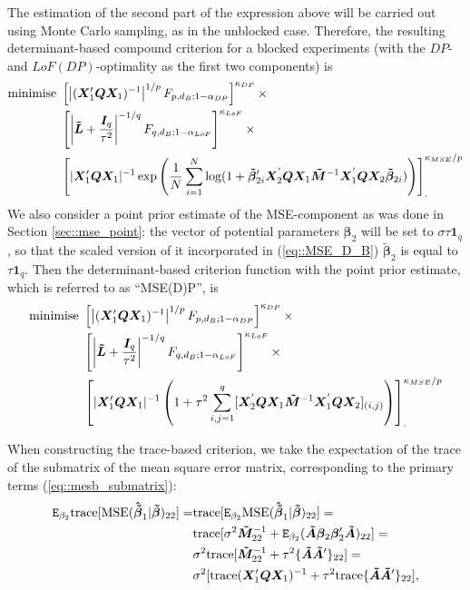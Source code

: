 The estimation of the second part of the expression above will be carried out using Monte Carlo sampling, as in the unblocked case. Therefore, the resulting determinant-based compound criterion for a blocked experiments (with the $DP$- and $LoF(DP)$-optimality as the first two components) is
\begin{align}
\label{eq::MSE_D_B}
\mbox{minimise }&\left[\left|(\bm{X}'_{1}\bm{Q}\bm{X}_{1})^{-1}\right|^{1/p}F_{p,d_B;1-\alpha_{DP}}\right]^{\kappa_{DP}} \times \notag \\ &\left[\left|\bm{\tilde{L}}+\frac{\bm{I}_{q}}{\tau^{2}}\right|^{-1/q}F_{q,d_B;1-\alpha_{LoF}}\right]^{\kappa_{LoF}}\times \notag\\ & \left[|\bm{X}'_{1}\bm{QX}_{1}|^{-1}\exp\left(\frac{1}{N}\sum_{i=1}^{N}\log(1+\bm{\tilde{\beta}}_{2i}'\bm{X}_2^{'}\bm{QX}_1\bm{\tilde{M}}^{-1}\bm{X}_1^{'}\bm{QX}_2\bm{\tilde{\beta}}_{2i})\right)\right]_{.}^{\kappa_{MSE}/p}
\end{align}
We also consider a point prior estimate of the MSE-component as was done in Section \ref{sec::mse_point}: the vector of potential parameters $\bm{\beta}_2$ will be set to $\sigma\tau\bm{1}_q$, so that the scaled version of it incorporated in (\ref{eq::MSE_D_B}) $\bm{\tilde{\beta}}_2$ is equal to $\tau\bm{1}_q$. Then the determinant-based criterion function with the point prior estimate, which is referred to as ``MSE(D)P'', is  
\begin{align}
\label{eq::MSE_DP_B}
\mbox{minimise }&\left[\left|(\bm{X}'_{1}\bm{Q}\bm{X}_{1})^{-1}\right|^{1/p}F_{p,d_B;1-\alpha_{DP}}\right]^{\kappa_{DP}} \times \notag \\ &\left[\left|\bm{\tilde{L}}+\frac{\bm{I}_{q}}{\tau^{2}}\right|^{-1/q}F_{q,d_B;1-\alpha_{LoF}}\right]^{\kappa_{LoF}}\times \notag\\ & \left[|\bm{X}'_{1}\bm{QX}_{1}|^{-1}\left(1+\tau^2\sum_{i,j=1}^{q}[\bm{X}_2^{'}\bm{QX}_1\bm{\tilde{M}}^{-1}\bm{X}_1^{'}\bm{QX}_2]_{(i,j)}\right)\right]_{.}^{\kappa_{MSE}/p}
\end{align}
 
When constructing the trace-based criterion, we take the expectation of the trace of the submatrix of the mean square error matrix, corresponding to the primary terms (\ref{eq::mesb_submatrix}):
\begin{align}
\label{eq::MSE_B_tr}
\mathtt{E}_{\beta_2}\mbox{trace}[\mbox{MSE}(\bm{\hat{\tilde{\beta}}}_1|\bm{\tilde{\beta}})_{22}]=& \mbox{trace}[\mathtt{E}_{\beta_2}\mbox{MSE}(\bm{\hat{\tilde{\beta}}}_1|\bm{\tilde{\beta}})_{22}]=\notag\\&\mbox{trace}[\sigma^2\bm{\tilde{M}}^{-1}_{22}+\mathtt{E}_{\beta_2}(\bm{\tilde{A}}\bm{\beta}_2\bm{\beta}_2'\bm{\tilde{A}})_{22}]=\notag \\& \sigma^2\mbox{trace}[\bm{\tilde{M}}^{-1}_{22}+\tau^2\{\bm{\tilde{A}}\bm{\tilde{A}}'\}_{22}]=\notag \\&\sigma^2[\mbox{trace}(\bm{X}'_{1}\bm{QX}_{1})^{-1}+\tau^2\mbox{trace}\{\bm{\tilde{A}}\bm{\tilde{A}}'\}_{22}],
\end{align}


